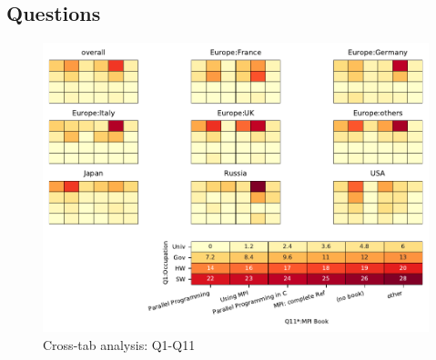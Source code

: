
\subsection{Questions}


\begin{figure}
\begin{center}
\includegraphics[width=12cm]{../pdfs/Q1-Q11.pdf}
\caption{Cross-tab analysis: Q1-Q11}
\label{fig:Q1-Q11}
\end{center}
\end{figure}
